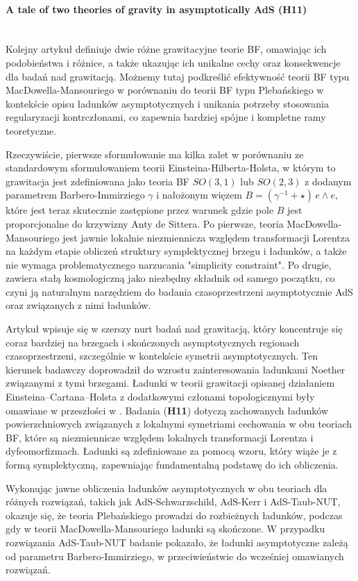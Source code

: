 \documentclass[12pt,a4paper]{article}
\newcommand{\myparagraph}[1]{\paragraph{#1}\mbox{}\\}
\begin{document}
\myparagraph{A tale of two theories of gravity in asymptotically AdS (H11)} 

Kolejny artykuł definiuje dwie różne grawitacyjne teorie BF, omawiając ich podobieństwa i różnice, a także ukazując ich unikalne cechy oraz konsekwencje dla badań nad grawitacją. Możnemy tutaj podkreślić efektywność teorii BF typu MacDowella-Mansouriego \cite{Freidel:2005ak, Durka:2012wd} w porównaniu do teorii BF typu Plebańskiego \cite{Plebanski:1977zz} w kontekście opisu ładunków asymptotycznych i unikania potrzeby stosowania regularyzacji kontrczłonami, co zapewnia bardziej spójne i kompletne ramy teoretyczne.

Rzeczywiście, pierwsze sformułowanie ma kilka zalet w porównaniu ze standardowym sformułowaniem teorii Einsteina-Hilberta-Holsta, w którym to grawitacja jest zdefiniowana jako teoria BF $SO(3,1)$ lub $SO(2,3)$ z dodanym parametrem Barbero-Immirziego $\gamma$ i nałożonym więzem $B = (\gamma^{-1} +\star)\, e\wedge e$, które jest teraz skutecznie zastępione przez warunek gdzie pole $B$ jest proporcjonalne do krzywizny Anty de Sittera. Po pierwsze, teoria MacDowella-Mansouriego jest jawnie lokalnie niezmiennicza względem transformacji Lorentza na każdym etapie obliczeń struktury symplektycznej brzegu i ładunków, a także nie wymaga problematycznego narzucania "simplicity constraint". Po drugie, zawiera stałą kosmologiczną jako niezbędny składnik od samego początku, co czyni ją naturalnym narzędziem do badania czasoprzestrzeni asymptotycznie AdS oraz związanych z nimi ładunków.

Artykuł wpisuje się w szerszy nurt badań nad grawitacją, który koncentruje się coraz bardziej na brzegach i skończonych asymptotycznych regionach czasoprzestrzeni, szczególnie w kontekście symetrii asymptotycznych. Ten kierunek badawczy doprowadził do wzrostu zainteresowania ładunkami Noether związanymi z tymi brzegami. Ładunki w teorii grawitacji opisanej działaniem Einsteina–Cartana–Holsta z dodatkowymi członami topologicznymi były omawiane w przeszłości w \cite{Durka:2012wd, Godazgar:2020gqd, Godazgar:2020kqd}. Badania (\textbf{H11}) dotyczą zachowanych ładunków powierzchniowych związanych z lokalnymi symetriami cechowania w obu teoriach BF, które są niezmiennicze względem lokalnych transformacji Lorentza i dyfeomorfizmach. Ładunki są zdefiniowane za pomocą wzoru, który wiąże je z formą symplektyczną, zapewniając fundamentalną podstawę do ich obliczenia. 

Wykonując jawne obliczenia ładunków asymptotycznych w obu teoriach dla różnych rozwiązań, takich jak AdS-Schwarzschild, AdS-Kerr i AdS-Taub-NUT, okazuje się, że teoria Plebańskiego prowadzi do rozbieżnych ładunków, podczas gdy w teorii MacDowella-Mansouriego ładunki są skończone. W przypadku rozwiązania AdS-Taub-NUT badanie pokazało, że ładunki asymptotyczne zależą od parametru Barbero-Immirziego, w przeciwieństwie do wcześniej omawianych rozwiązań.
\end{document}
